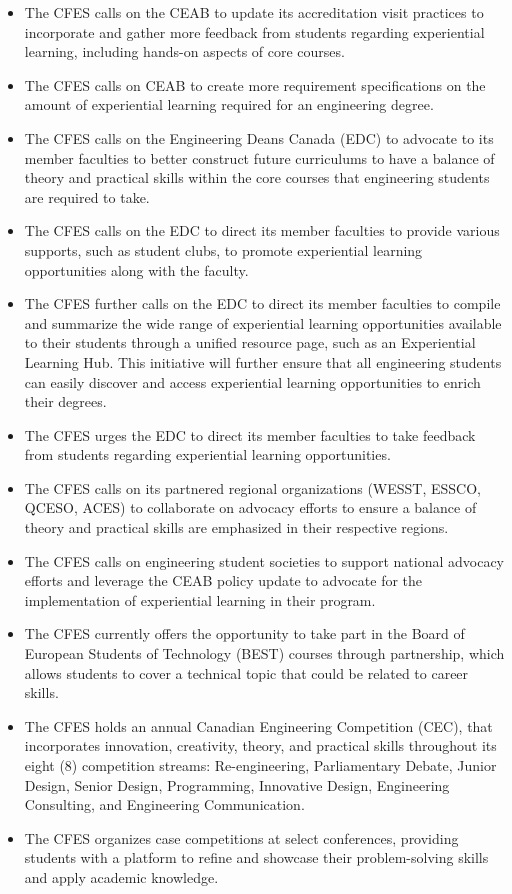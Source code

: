 \begin{itemize}
 \item The CFES calls on the CEAB to update its accreditation visit practices to incorporate and gather more feedback from students regarding experiential learning, including hands-on aspects of core courses.
 \item The CFES calls on CEAB to create more requirement specifications on the amount of experiential learning required for an engineering degree.
 \item The CFES calls on the Engineering Deans Canada (EDC) to advocate to its member faculties to better construct future curriculums to have a balance of theory and practical skills within the core courses that engineering students are required to take.
 \item The CFES calls on the EDC to direct its member faculties to provide various supports, such as student clubs, to promote experiential learning opportunities along with the faculty.
 \item The CFES further calls on the EDC to direct its member faculties to compile and summarize the wide range of experiential learning opportunities available to their students through a unified resource page, such as an Experiential Learning Hub. This initiative will further ensure that all engineering students can easily discover and access experiential learning opportunities to enrich their degrees.
 \item The CFES urges the EDC to direct its member faculties to take feedback from students regarding experiential learning opportunities.
 \item The CFES calls on its partnered regional organizations (WESST, ESSCO, QCESO, ACES) to collaborate on advocacy efforts to ensure a balance of theory and practical skills are emphasized in their respective regions.
 \item The CFES calls on engineering student societies to support national advocacy efforts and leverage the CEAB policy update to advocate for the implementation of experiential learning in their program.
\end{itemize}

\begin{itemize}
 \item The CFES currently offers the opportunity to take part in the Board of European Students of Technology (BEST) courses through partnership, which allows students to cover a technical topic that could be related to career skills.
 \item The CFES holds an annual Canadian Engineering Competition (CEC), that incorporates innovation, creativity, theory, and practical skills throughout its eight (8) competition streams: Re-engineering, Parliamentary Debate, Junior Design, Senior Design, Programming, Innovative Design, Engineering Consulting, and Engineering Communication.
 \item The CFES organizes case competitions at select conferences, providing students with a platform to refine and showcase their problem-solving skills and apply academic knowledge.
\end{itemize}

